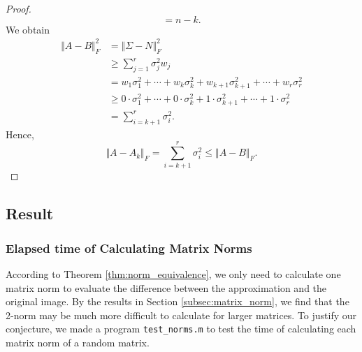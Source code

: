 \documentclass[12pt]{article}
\theoremstyle{definition}
\begin{document}
\begin{proof}
\[    = n-k.
    \]
    We obtain 
    \begin{align*}
        \Vert A-B \Vert_F^2
        &= \Vert \Sigma-N \Vert_F^2 \\
        &\geq \sum_{j=1}^r{\sigma_j^2 w_j} \\
        &= w_1\sigma_1^2 + \cdots + w_k\sigma_k^2 + w_{k+1}\sigma_{k+1}^2 + \cdots + w_r\sigma_r^2 \\
        &\geq 0\cdot\sigma_1^2 + \cdots + 0\cdot\sigma_k^2 + 1\cdot\sigma_{k+1}^2 + \cdots + 1\cdot\sigma_r^2 \\
        &= \sum_{i=k+1}^r{\sigma_i^2}.
    \end{align*}
    Hence, 
    \[ \Vert A-A_k \Vert_F 
    = \sum_{i=k+1}^r{\sigma_i^2}
    \leq \Vert A-B \Vert_F.
    \]
\end{proof}

\subsection{Result}
\subsubsection{Elapsed time of Calculating Matrix Norms}
According to Theorem \ref{thm:norm_equivalence}, we only need to calculate one matrix norm to evaluate the difference between the approximation and the original image. By the results in Section \ref{subsec:matrix_norm}, we find that the 2-norm may be much more difficult to calculate for larger matrices. To justify our conjecture, we made a program \texttt{test\_norms.m} to test the time of calculating each matrix norm of a random matrix.
\end{document}
